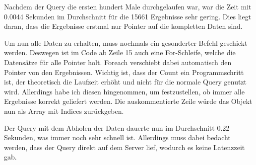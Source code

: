 Nachdem der Query die ersten hundert Male durchgelaufen war, war die Zeit mit 0.0044 Sekunden im Durchschnitt für die 15661 Ergebnisse sehr gering. Dies liegt daran, dass die Ergebnisse erstmal nur Pointer auf die kompletten Daten sind. 

Um nun alle Daten zu erhalten, muss nochmals ein gesonderter Befehl geschickt werden. Deswegen ist im Code ab Zeile 15 auch eine For-Schleife, welche die Datensätze für alle Pointer holt. Foreach verschiebt dabei automatisch den Pointer von den Ergebnissen. Wichtig ist, dass der Count ein Programmschritt ist, der theoretisch die Laufzeit erhöht und nicht für die normale Query genutzt wird. Allerdings habe ich diesen hingenommen, um festzustellen, ob immer alle Ergebnisse korrekt geliefert werden. 
Die auskommentierte Zeile würde das Objekt nun als Array mit Indices zurückgeben. 

Der Query mit dem Abholen der Daten dauerte nun im Durchschnitt 0.22 Sekunden, was immer noch sehr schnell ist. Allerdings muss dabei bedacht werden, dass der Query direkt auf dem Server lief, wodurch es keine Latenzzeit gab.
